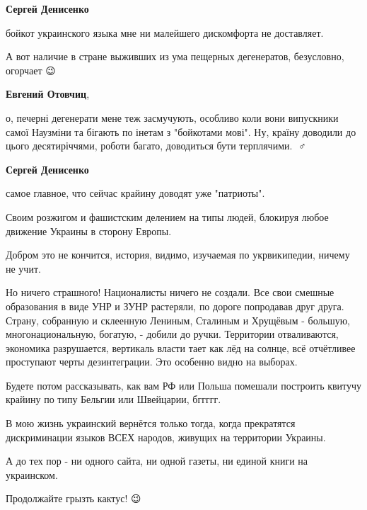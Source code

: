\begin{itemize}
\begin{itemize}

\textbf{Сергей Денисенко} 

бойкот украинского языка мне ни малейшего дискомфорта не доставляет.

А вот наличие в стране выживших из ума пещерных дегенератов, безусловно,
огорчает 😉


\textbf{Евгений Отовчиц}, 

о, печерні дегенерати мене теж засмучують, особливо коли вони випускники самої
Наузміни та бігають по інетам з "бойкотами мові". Ну, країну доводили до цього
десятиріччями, роботи багато, доводиться бути терплячими.
🤷♂️



\textbf{Сергей Денисенко} 

самое главное, что сейчас крайину доводят уже "патриоты".

Своим розжигом и фашистским делением на типы людей, блокируя любое движение Украины в сторону Европы.

Добром это не кончится, история, видимо, изучаемая по укрвикипедии, ничему не учит.

Но ничего страшного! Националисты ничего не создали. Все свои смешные
образования в виде УНР и ЗУНР растеряли, по дороге попродавав друг друга.
Страну, собранную и склеенную Лениным, Сталиным и Хрущёвым - большую,
многонациональную, богатую, - добили до ручки. Территории отваливаются,
экономика разрушается, вертикаль власти тает как лёд на солнце, всё отчётливее
проступают черты дезинтеграции. Это особенно видно на выборах.

Будете потом рассказывать, как вам РФ или Польша помешали построить квитучу
крайину по типу Бельгии или Швейцарии, бггггг.

В мою жизнь украинский вернётся только тогда, когда прекратятся дискриминации
языков ВСЕХ народов, живущих на территории Украины.

А до тех пор - ни одного сайта, ни одной газеты, ни единой книги на украинском.

Продолжайте грызть кактус! 😉



\end{itemize}
\end{itemize}
